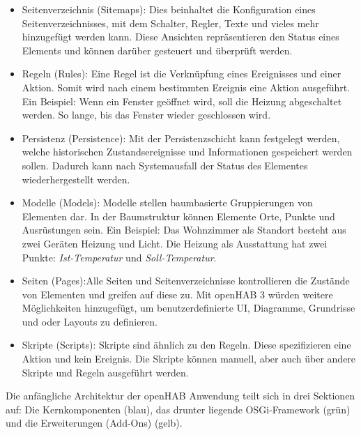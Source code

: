     \begin{itemize}
        \item Seitenverzeichnis (Sitemaps): Dies beinhaltet die Konfiguration eines Seitenverzeichnisses, mit dem Schalter, 
        Regler, Texte und vieles mehr hinzugefügt werden kann. Diese Ansichten repräsentieren den Status eines Elements und 
        können darüber gesteuert und überprüft werden.
        \item Regeln (Rules): Eine Regel ist die Verknüpfung eines Ereignisses und einer Aktion. Somit wird nach einem bestimmten 
        Ereignis eine Aktion ausgeführt. Ein Beispiel: Wenn ein Fenster geöffnet wird, soll die Heizung abgeschaltet werden. 
        So lange, bis das Fenster wieder geschlossen wird. 
        \item Persistenz (Persistence): Mit der Persistenzschicht kann festgelegt werden, welche historischen Zustandsereignisse 
        und Informationen gespeichert werden sollen. Dadurch kann nach Systemausfall der Status des Elementes wiederhergestellt werden. 
        \item Modelle (Models): Modelle stellen baumbasierte Gruppierungen von Elementen dar. In der Baumstruktur können Elemente 
        Orte, Punkte und Ausrüstungen sein. Ein Beispiel: Das Wohnzimmer als Standort besteht aus zwei Geräten Heizung und Licht. 
        Die Heizung als Ausstattung hat zwei Punkte: \textit{Ist-Temperatur} und \textit{Soll-Temperatur}.
        \item Seiten (Pages):Alle Seiten und Seitenverzeichnisse kontrollieren die Zustände von Elementen und greifen auf diese zu. 
        Mit openHAB 3 würden weitere Möglichkeiten hinzugefügt, um benutzerdefinierte \acs{UI}, Diagramme, Grundrisse und oder 
        Layouts zu definieren. 
        \item Skripte (Scripts): Skripte sind ähnlich zu den Regeln. Diese spezifizieren eine Aktion und kein Ereignis. Die Skripte 
        können manuell, aber auch über andere Skripte und Regeln ausgeführt werden. 
    \end{itemize}
    Die anfängliche Architektur der openHAB Anwendung teilt sich in drei Sektionen auf: Die Kernkomponenten (blau), das drunter 
    liegende OSGi-Framework (grün) und die Erweiterungen (Add-Ons) (gelb). 
